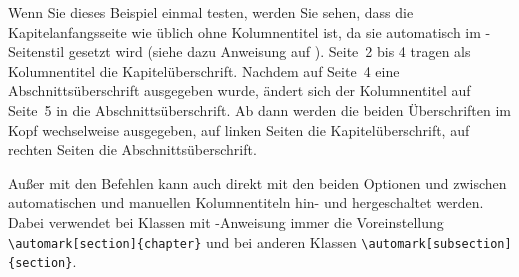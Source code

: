 \begin{Example}
      Wenn Sie dieses Beispiel einmal testen, werden Sie sehen, dass die
      Kapitelanfangsseite wie üblich ohne Kolumnentitel ist, da sie
      automatisch im -Seitenstil
       gesetzt wird (siehe
      dazu Anweisung  auf
      ). Seite~2 bis 4 tragen als
      Kolumnentitel die Kapitelüberschrift. Nachdem auf Seite~4 eine
      Abschnittsüberschrift ausgegeben wurde, ändert sich der Kolumnentitel
      auf Seite~5 in die Abschnittsüberschrift. Ab dann werden die beiden
      Überschriften im Kopf wechselweise ausgegeben, auf linken Seiten die
      Kapitelüberschrift, auf rechten Seiten die Abschnittsüberschrift.%
    \end{Example}
  \fi

  Außer mit den Befehlen
  kann auch direkt mit den beiden Optionen
   und
   zwischen automatischen und manuellen Kolumnentiteln hin-
  und hergeschaltet werden. Dabei verwendet  bei Klassen mit
  -Anweisung immer die
  Voreinstellung
  \IfThisCommonLabelBase{scrlayer-scrpage}{\iftrue}{\csname
    iffalse\endcsname}%
    \lstinline|\automark[section]{chapter}| und bei anderen Klassen
    \lstinline|\automark[subsection]{section}|.
  \else
\begin{lstcode}
  \automark[section]{chapter}
\end{lstcode}
  und bei anderen Klassen:
\begin{lstcode}
  \automark[subsection]{section}
\end{lstcode}
  \fi

